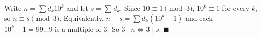 Write $n=\sum d_k10^k$ and let $s=\sum d_k$. Since $10\equiv1\pmod3$, $10^k\equiv1$ for every $k$, so $n\equiv s\pmod3$. Equivalently, $n-s=\sum d_k(10^k-1)$ and each $10^k-1=99\ldots9$ is a multiple of $3$. So $3\mid n\iff3\mid s$. $\blacksquare$
